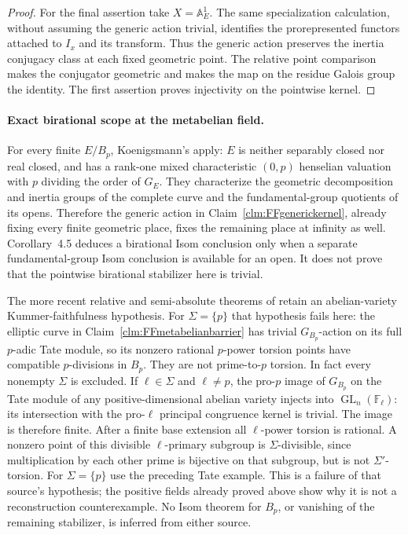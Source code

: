 \begin{proof}
For the final assertion take \(X=\mathbb A^1_E\).
The same specialization calculation, without assuming
the generic action trivial, identifies the prorepresented
functors attached to \(I_x\) and its transform. Thus
the generic action preserves the inertia conjugacy class
at each fixed geometric point. The relative point
comparison makes the conjugator geometric and makes the
map on the residue Galois group the identity. The first
assertion proves injectivity on the pointwise kernel.
\end{proof}

\paragraph{Exact birational scope at the metabelian field.}
For every finite \(E/B_p\), Koenigsmann's
\citet[Theorem~4.1, Corollaries~4.3 and~4.5]
{FF_Koenigsmann2003} apply: \(E\) is neither separably
closed nor real closed, and has a rank-one mixed
characteristic \((0,p)\) henselian valuation with
\(p\) dividing the order of \(G_E\).
They characterize the geometric decomposition and inertia
groups of the complete curve and the fundamental-group
quotients of its opens. Therefore the generic action in
Claim~\ref{clm:FFgenerickernel}, already fixing every
finite geometric place, fixes the remaining place at
infinity as well. Corollary~4.5 deduces a birational
Isom conclusion only when a separate fundamental-group
Isom conclusion is available for an open. It does not
prove that the pointwise birational stabilizer here is
trivial.

The more recent relative and semi-absolute theorems of
\citet[Theorems~A and~E, Definition~1.1,
Proposition~2.6]{FF_Tsujimura2026} retain an abelian-variety
Kummer-faithfulness hypothesis. For \(\Sigma=\{p\}\)
that hypothesis fails here: the elliptic curve in
Claim~\ref{clm:FFmetabelianbarrier} has trivial
\(G_{B_p}\)-action on its full \(p\)-adic Tate module,
so its nonzero rational \(p\)-power torsion points have
compatible \(p\)-divisions in \(B_p\). They are not
prime-to-\(p\) torsion. In fact every nonempty
\(\Sigma\) is excluded. If \(\ell\in\Sigma\)
and \(\ell\ne p\), the pro-\(p\) image of
\(G_{B_p}\) on the Tate module of any positive-dimensional
abelian variety injects into \(\operatorname{GL}_n(\mathbb F_\ell)\):
its intersection with the pro-\(\ell\) principal
congruence kernel is trivial. The image is therefore
finite. After a finite base extension all
\(\ell\)-power torsion is rational. A nonzero point
of this divisible \(\ell\)-primary subgroup is
\(\Sigma\)-divisible, since multiplication by each
other prime is bijective on that subgroup, but is not
\(\Sigma'\)-torsion. For \(\Sigma=\{p\}\) use
the preceding Tate example. This is a failure of that
source's hypothesis; the positive fields already proved
above show why it is not a reconstruction counterexample.
No Isom theorem for \(B_p\),
or vanishing of the remaining stabilizer, is inferred
from either source.

